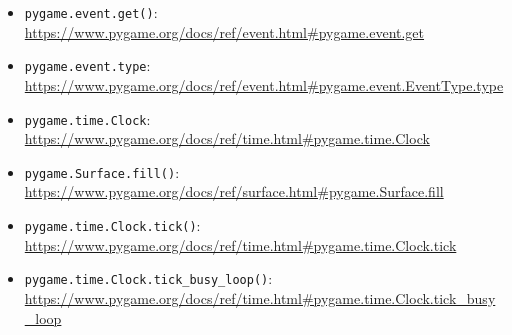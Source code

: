 \begin{itemize}
	\item \texttt{pygame.event.get()}:
	\\
	\url{https://www.pygame.org/docs/ref/event.html#pygame.event.get}
	
	\item \texttt{pygame.event.type}:
	\\
	\url{https://www.pygame.org/docs/ref/event.html#pygame.event.EventType.type}
	
	\item \texttt{pygame.time.Clock}:
	\\
	\url{https://www.pygame.org/docs/ref/time.html#pygame.time.Clock}
	
	\item \texttt{pygame.Surface.fill()}:
	\\
	\url{https://www.pygame.org/docs/ref/surface.html#pygame.Surface.fill}

	\item \texttt{pygame.time.Clock.tick()}:
	\\
	\url{https://www.pygame.org/docs/ref/time.html#pygame.time.Clock.tick}
	
	\item \texttt{pygame.time.Clock.tick\_busy\_loop()}:
	\\
	\url{https://www.pygame.org/docs/ref/time.html#pygame.time.Clock.tick_busy_loop}
\end{itemize}


